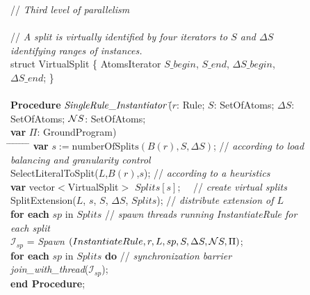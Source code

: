 \documentclass[preprint]{tlp}
\newcommand{\DNF}{\ensuremath{\Delta S}\xspace}
\newcommand{\NNF}{\ensuremath{{\cal N}S}\xspace}
\newcommand{\gpii}{\mbox{$\Pi$}}
\begin{document}
\begin{figure}[th!]
\begin{center}
\begin{small}
\begin{tabbing}

// {\em Third level of parallelism}\\ \
\\
// {\em A split is virtually identified by four iterators to $S$ and $\DNF$ identifying ranges of instances. }\\
struct VirtualSplit
\{
AtomsIterator $S\_begin$, $S\_end$, $\DNF\_begin$, $\DNF\_end$;
\}\\ \
\\
{\bf Procedure} $\mathit{  SingleRule\_Instantiator\/}$\=($r$: Rule; $S$: SetOfAtoms; \DNF: SetOfAtoms; \NNF: SetOfAtoms;\\
                                     \> {\bf var} $\gpii$: GroundProgram)\\
\hspace*{0.2cm} \= \kill
\hspace*{0.4cm} \= \hspace*{0.4cm} \= \hspace*{0.4cm} \=
\hspace*{0.4cm} \= \hspace*{0.4cm} \= \hspace*{3cm} \=\kill
\> {\bf var} $s:= \text{numberOfSplits}(B(r),S,\DNF)$; // {\em  according to load balancing and granularity control} \\
\> SelectLiteralToSplit($L$,$B(r)$,$s$); \hspace{0.82cm} // {\em  according to a heuristics} \\
\> {\bf var} vector$<$VirtualSplit$>$ $Splits[s]$; \ \  // {\em  create virtual splits} \\
\> SplitExtension($L$, $s$, $S$, \DNF, $Splits$); \hspace{0.7 cm} // {\em  distribute extension of $L$} \\
\> {\bf for each} $sp$ in $Splits$ \hspace{2.05 cm}// {\em  spawn threads running InstantiateRule for each split} \\
\>\> $\mathcal{I}_{sp}$ = {\em Spawn} $(InstantiateRule, r, L, sp, S,\DNF,\NNF,\gpii)$; \\
\> {\bf for each} $sp$ in $Splits$ {\bf do} \hspace{1.5 cm} // {\em synchronization barrier} \\
\>\> {\em join\_with\_thread}($\mathcal{I}_{sp}$); \\
{\bf end Procedure}; \\


\end{tabbing}
\end{small}
\end{center}
\end{figure}
\end{document}
